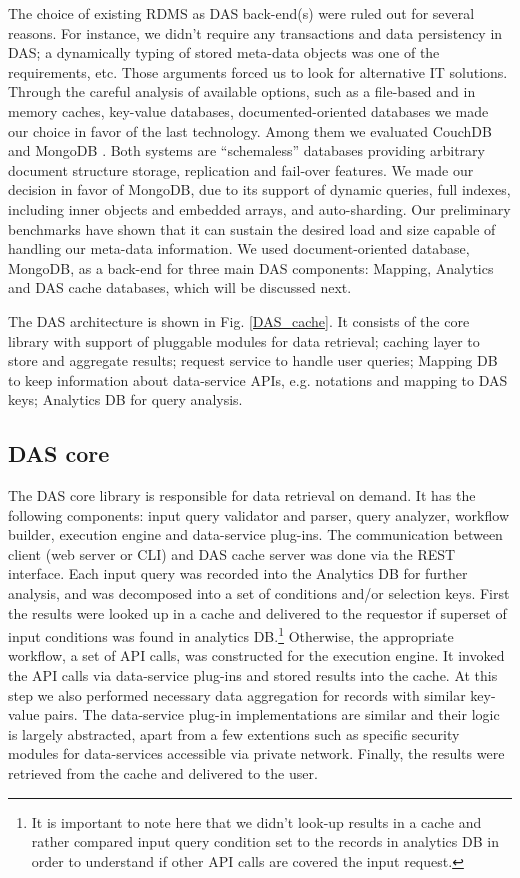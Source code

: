 \documentclass[1p,times]{elsarticle}
\begin{document}
\noindent
The choice of existing RDMS as DAS back-end(s) were ruled out for several reasons. 
For instance, we didn't require any transactions and data persistency in DAS;
a dynamically typing of stored meta-data objects was one of the requirements, etc.
Those arguments forced us to look for alternative IT solutions.
Through the careful analysis of available options, such as a file-based and in memory caches, 
key-value databases, documented-oriented databases we made our choice in favor 
of the last technology. Among them we evaluated CouchDB \cite{CouchDB} and 
MongoDB \cite{MongoDB}. Both systems are ``schemaless'' databases providing
arbitrary document structure storage, replication and fail-over features. 
We made our decision in favor of MongoDB, due to its support of dynamic queries, 
full indexes, including inner objects and embedded arrays,
and auto-sharding. Our preliminary benchmarks have shown that it can sustain
the desired load and size capable of handling our meta-data information. We used 
document-oriented database, MongoDB, as a back-end for three 
main DAS components: Mapping, Analytics and DAS cache databases, 
which will be discussed next. 

The DAS architecture is shown in Fig. \ref{DAS_cache}. It consists of
the core library with support of pluggable modules for data retrieval;
caching layer to store and aggregate results;
request service to handle user queries;
Mapping DB to keep information about data-service APIs, e.g.
notations and mapping to DAS keys;
Analytics DB for query analysis.

\subsection{DAS core\label{DAS_core}}
The DAS core library is responsible for data retrieval on demand. 
It has the following components: input query validator and parser,
query analyzer, workflow builder, execution engine and data-service 
plug-ins. The communication between client (web server or CLI) and 
DAS cache server was done via the REST \cite{REST} interface. 
Each input query was recorded into the Analytics DB for further 
analysis, and was decomposed into a set of conditions and/or selection keys.
First the results were looked up in a cache and delivered to the requestor
if superset of input conditions was found in analytics DB.\footnote{It is important
to note here that we didn't look-up results in a cache and rather
compared input query condition set to the records in analytics DB 
in order to understand if other API calls are covered the input request.}
Otherwise, the appropriate workflow, a set of API calls, was constructed
for the execution engine. It invoked the API calls via data-service
plug-ins and stored results into the cache. At this step we also
performed necessary data aggregation for records with similar key-value
pairs. The data-service plug-in implementations are similar and their 
logic is largely abstracted, apart from a few extentions such as specific
security modules for data-services accessible via private network.
Finally, the results were retrieved from the cache and delivered to the user. 
\end{document}
